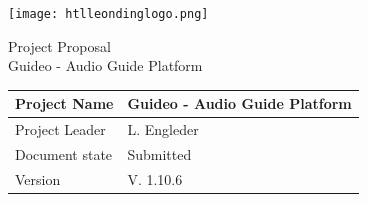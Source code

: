 \documentclass[12pt]{article}
\theoremstyle{definition}
\newcommand{\productname}{Guideo - Audio Guide Platform}
\newcommand{\projectleader}{L. Engleder}
\newcommand{\documentstatus}{Submitted}
\newcommand{\version}{V. 1.10.6}
\begin{document}
\begin{titlepage}
\begin{flushright}
\texttt{[image: htlleondinglogo.png]}\\
\end{flushright}
 
\vspace{10em}
 
\begin{center}
{\Huge Project Proposal} \\[3em]
{\LARGE \productname} \\[3em]
\end{center}
 
\begin{flushleft}
\begin{tabular}{|l|l|}
\hline
Project Name & \productname \\ \hline
Project Leader & \projectleader \\ \hline
Document state & \documentstatus \\ \hline
Version & \version \\ \hline
\end{tabular}
\end{flushleft}
 
\end{titlepage}
\end{document}
